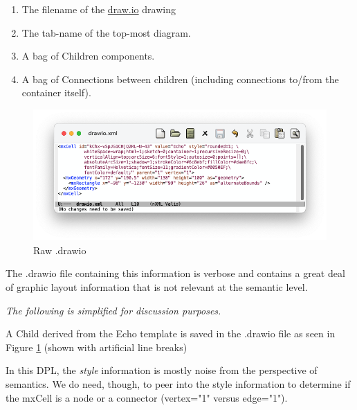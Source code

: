 \documentclass[10pt,anonymous,review]{acmart}
\begin{document}
\begin{enumerate}
\item The filename of the \href{http://draw.io}{draw.io} drawing

\item The tab-name of the top-most diagram.

\item A bag of Children components.

\item A bag of Connections between children (including connections to/from the container itself).

\end{enumerate}

  \begin{figure}
    \includegraphics[trim=1cm 2cm 1.5cm 1cm, clip, scale=0.4]{./media/drawio1.png}
    \caption{Raw .drawio}
    \label{drawio1}
\end{figure}

The .drawio file containing this information is verbose and contains a great deal of graphic layout information that is not relevant at the semantic level.

\emph{The following is simplified for discussion purposes.}

A Child derived from the Echo template is saved in the .drawio file as seen in Figure \ref{drawio1} (shown with artificial line breaks)

In this DPL, the \emph{style} information is mostly noise from the perspective of semantics. We do need, though, to peer into the style information to determine if the mxCell is a node or a connector (vertex="1" versus edge="1").
\end{document}
